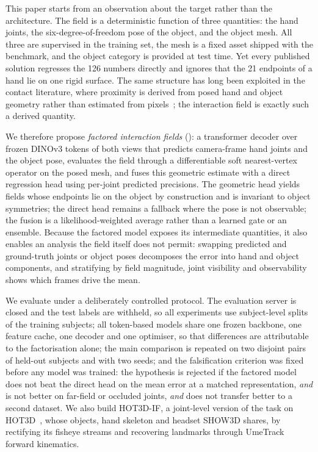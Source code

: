 This paper starts from an observation about the target rather than the architecture. The field is a deterministic function of three quantities: the hand joints, the six-degree-of-freedom pose of the object, and the object mesh. All three are supervised in the training set, the mesh is a fixed asset shipped with the benchmark, and the object category is provided at test time. Yet every published solution regresses the 126 numbers directly and ignores that the 21 endpoints of a hand lie on one rigid surface. The same structure has long been exploited in the contact literature, where proximity is derived from posed hand and object geometry rather than estimated from pixels~\cite{yang2021cpf,grady2021contactopt,qi2024hoisdf,chen2023gsdf,ilic2026egophi}; the interaction field is exactly such a derived quantity.

We therefore propose \emph{factored interaction fields} (\method{}): a transformer decoder over frozen DINOv3 tokens of both views that predicts camera-frame hand joints and the object pose, evaluates the field through a differentiable soft nearest-vertex operator on the posed mesh, and fuses this geometric estimate with a direct regression head using per-joint predicted precisions. The geometric head yields fields whose endpoints lie on the object by construction and is invariant to object symmetries; the direct head remains a fallback where the pose is not observable; the fusion is a likelihood-weighted average rather than a learned gate or an ensemble. Because the factored model exposes its intermediate quantities, it also enables an analysis the field itself does not permit: swapping predicted and ground-truth joints or object poses decomposes the error into hand and object components, and stratifying by field magnitude, joint visibility and observability shows which frames drive the mean.

We evaluate under a deliberately controlled protocol. The evaluation server is closed and the test labels are withheld, so all experiments use subject-level splits of the training subjects; all token-based models share one frozen backbone, one feature cache, one decoder and one optimiser, so that differences are attributable to the factorisation alone; the main comparison is repeated on two disjoint pairs of held-out subjects and with two seeds; and the falsification criterion was fixed before any model was trained: the hypothesis is rejected if the factored model does not beat the direct head on the mean error at a matched representation, \emph{and} is not better on far-field or occluded joints, \emph{and} does not transfer better to a second dataset. We also build HOT3D-IF, a joint-level version of the task on HOT3D~\cite{banerjee2025hot3d}, whose objects, hand skeleton and headset SHOW3D shares, by rectifying its fisheye streams and recovering landmarks through UmeTrack forward kinematics.

